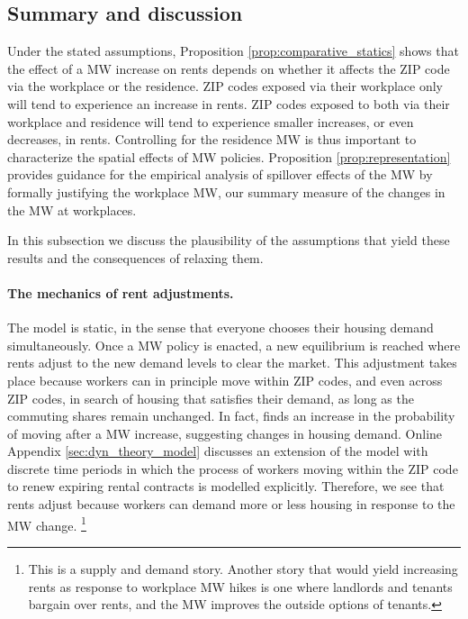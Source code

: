 \subsection{Summary and discussion}
\label{sec:model_summary}

Under the stated assumptions, Proposition \ref{prop:comparative_statics} shows 
that the effect of a MW increase on rents depends on whether it affects the 
ZIP code via the workplace or the residence.
ZIP codes exposed via their workplace only will tend to experience an 
increase in rents.
ZIP codes exposed to both via their workplace and residence will tend to 
experience smaller increases, or even decreases, in rents.
Controlling for the residence MW is thus important to characterize the spatial 
effects of MW policies.
Proposition \ref{prop:representation} provides guidance for the empirical
analysis of spillover effects of the MW by formally justifying the 
workplace MW, our summary measure of the changes in the MW at workplaces.

In this subsection we discuss the plausibility of the assumptions that yield 
these results and the consequences of relaxing them.

\paragraph{The mechanics of rent adjustments.}

The model is static, in the sense that everyone chooses their housing demand 
simultaneously.
Once a MW policy is enacted, a new equilibrium is reached where rents adjust
to the new demand levels to clear the market.
This adjustment takes place because workers can in principle move within ZIP 
codes, and even across ZIP codes, in search of housing that satisfies their 
demand, as long as the commuting shares remain unchanged.
In fact, \textcite{AgarwalEtAl2022} finds an increase in the probability of 
moving after a MW increase, suggesting changes in housing demand.
Online Appendix \ref{sec:dyn_theory_model} discusses an extension of the model
with discrete time periods in which the process of workers moving within the 
ZIP code to renew expiring rental contracts is modelled explicitly.
Therefore, we see that rents adjust because workers can demand more or less 
housing in response to the MW change.%
\footnote{This is a supply and demand story. 
    Another story that would yield increasing rents as response to workplace MW
    hikes is one where landlords and tenants bargain over rents, 
    and the MW improves the outside options of tenants.}

